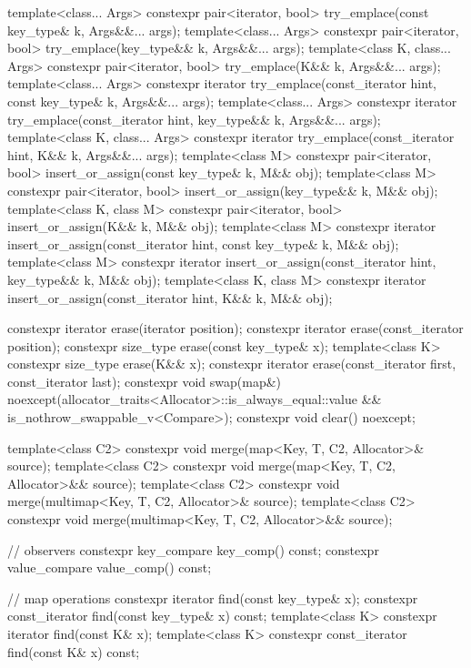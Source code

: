 \begin{codeblock}
{{    template<class... Args>
      constexpr pair<iterator, bool> try_emplace(const key_type& k, Args&&... args);
    template<class... Args>
      constexpr pair<iterator, bool> try_emplace(key_type&& k, Args&&... args);
    template<class K, class... Args>
      constexpr pair<iterator, bool> try_emplace(K&& k, Args&&... args);
    template<class... Args>
      constexpr iterator try_emplace(const_iterator hint, const key_type& k, Args&&... args);
    template<class... Args>
      constexpr iterator try_emplace(const_iterator hint, key_type&& k, Args&&... args);
    template<class K, class... Args>
      constexpr iterator try_emplace(const_iterator hint, K&& k, Args&&... args);
    template<class M>
      constexpr pair<iterator, bool> insert_or_assign(const key_type& k, M&& obj);
    template<class M>
      constexpr pair<iterator, bool> insert_or_assign(key_type&& k, M&& obj);
    template<class K, class M>
      constexpr pair<iterator, bool> insert_or_assign(K&& k, M&& obj);
    template<class M>
      constexpr iterator insert_or_assign(const_iterator hint, const key_type& k, M&& obj);
    template<class M>
      constexpr iterator insert_or_assign(const_iterator hint, key_type&& k, M&& obj);
    template<class K, class M>
      constexpr iterator insert_or_assign(const_iterator hint, K&& k, M&& obj);

    constexpr iterator  erase(iterator position);
    constexpr iterator  erase(const_iterator position);
    constexpr size_type erase(const key_type& x);
    template<class K> constexpr size_type erase(K&& x);
    constexpr iterator  erase(const_iterator first, const_iterator last);
    constexpr void      swap(map&)
      noexcept(allocator_traits<Allocator>::is_always_equal::value &&
               is_nothrow_swappable_v<Compare>);
    constexpr void      clear() noexcept;

    template<class C2>
      constexpr void merge(map<Key, T, C2, Allocator>& source);
    template<class C2>
      constexpr void merge(map<Key, T, C2, Allocator>&& source);
    template<class C2>
      constexpr void merge(multimap<Key, T, C2, Allocator>& source);
    template<class C2>
      constexpr void merge(multimap<Key, T, C2, Allocator>&& source);

    // observers
    constexpr key_compare key_comp() const;
    constexpr value_compare value_comp() const;

    // map operations
    constexpr iterator       find(const key_type& x);
    constexpr const_iterator find(const key_type& x) const;
    template<class K> constexpr iterator       find(const K& x);
    template<class K> constexpr const_iterator find(const K& x) const;

}}
\end{codeblock}
